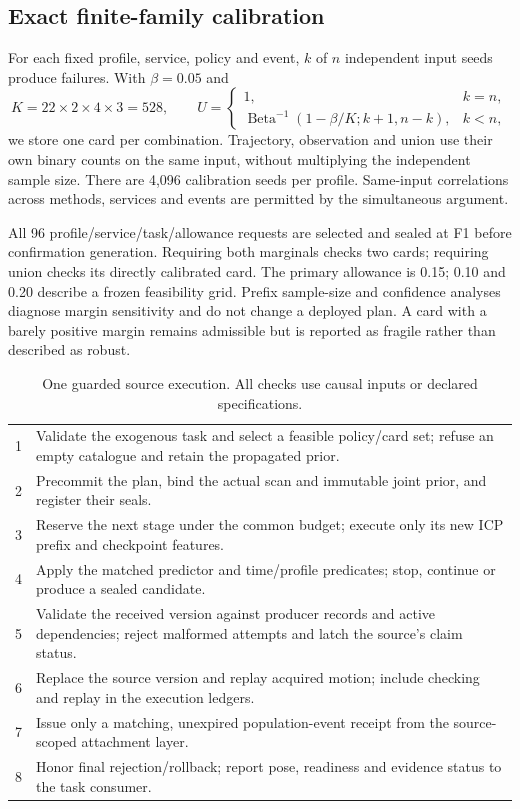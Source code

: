 \subsection{Exact finite-family calibration}
For each fixed profile, service, policy and event, $k$ of $n$ independent input seeds produce failures. With $\beta=0.05$ and
\begin{equation}
K=22\times2\times4\times3=528,\qquad
U=\begin{cases}1,&k=n,\\\operatorname{Beta}^{-1}(1-\beta/K;k+1,n-k),&k<n,\end{cases}\label{eq:cp}
\end{equation}
we store one card per combination. Trajectory, observation and union use their own binary counts on the same input, without multiplying the independent sample size. There are 4,096 calibration seeds per profile. Same-input correlations across methods, services and events are permitted by the simultaneous argument.

All 96 profile/service/task/allowance requests are selected and sealed at F1 before confirmation generation. Requiring both marginals checks two cards; requiring union checks its directly calibrated card. The primary allowance is 0.15; 0.10 and 0.20 describe a frozen feasibility grid. Prefix sample-size and confidence analyses diagnose margin sensitivity and do not change a deployed plan. A card with a barely positive margin remains admissible but is reported as fragile rather than described as robust.

\begin{table}[t]\centering\small
\caption{One guarded source execution. All checks use causal inputs or declared specifications.}\label{tab:algorithm}
\begin{tabularx}{\linewidth}{@{}rX@{}}\toprule
1 & Validate the exogenous task and select a feasible policy/card set; refuse an empty catalogue and retain the propagated prior.\\
2 & Precommit the plan, bind the actual scan and immutable joint prior, and register their seals.\\
3 & Reserve the next stage under the common budget; execute only its new ICP prefix and checkpoint features.\\
4 & Apply the matched predictor and time/profile predicates; stop, continue or produce a sealed candidate.\\
5 & Validate the received version against producer records and active dependencies; reject malformed attempts and latch the source's claim status.\\
6 & Replace the source version and replay acquired motion; include checking and replay in the execution ledgers.\\
7 & Issue only a matching, unexpired population-event receipt from the source-scoped attachment layer.\\
8 & Honor final rejection/rollback; report pose, readiness and evidence status to the task consumer.\\\bottomrule
\end{tabularx}
\end{table}

